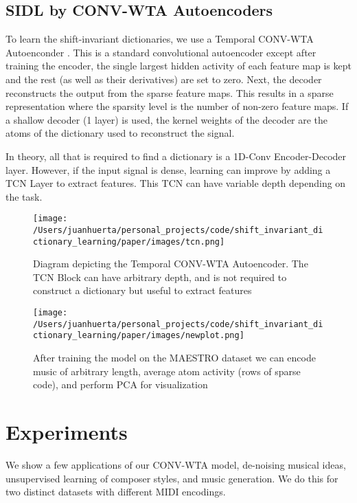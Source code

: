 \documentclass[11pt,a4paper]{article}
\begin{document}
\subsection{SIDL by CONV-WTA Autoencoders}
To learn the shift-invariant dictionaries, we use a Temporal CONV-WTA Autoenconder \cite{DBLP:journals/corr/MakhzaniF14}. This is a standard convolutional autoencoder except after training the encoder, the single largest hidden activity of each feature map is kept and the rest (as well as their derivatives) are set to zero. Next, the decoder reconstructs the output from the sparse feature maps. This results in a sparse representation where the sparsity level is the number of non-zero feature maps. If a shallow decoder (1 layer) is used, the kernel weights of the decoder are the atoms of the dictionary used to reconstruct the signal. 

In theory, all that is required to find a dictionary is a 1D-Conv Encoder-Decoder layer. However, if the input signal is dense, learning can improve by adding a TCN Layer to extract features. This TCN can have variable depth depending on the task.

\begin{figure}[ht]
  \texttt{[image: /Users/juanhuerta/personal\_projects/code/shift\_invariant\_dictionary\_learning/paper/images/tcn.png]}
  \caption{Diagram depicting the Temporal CONV-WTA Autoencoder. The TCN Block can have arbitrary depth, and is not required to construct a dictionary but useful to extract features}
  \label{fig:bt1}
\end{figure}

\begin{figure*}[ht]
  \texttt{[image: /Users/juanhuerta/personal\_projects/code/shift\_invariant\_dictionary\_learning/paper/images/newplot.png]}
  \caption{After training the model on the MAESTRO dataset we can encode music of arbitrary length, average atom activity (rows of sparse code), and perform PCA for visualization }
    \label{fig:b4}
\end{figure*}




\section{Experiments}
\label{ssec:experiments}

We show a few applications of our CONV-WTA model, de-noising musical ideas, unsupervised learning of composer styles, and music generation. We do this for two distinct datasets with different MIDI encodings.
\end{document}
